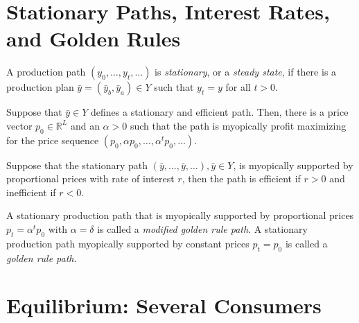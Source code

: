 \section{Stationary Paths, Interest Rates, and Golden Rules}

\begin{defn}
    A production path $(y_0, \dots, y_t, \dots)$ is \emph{stationary}, or a \emph{steady state}, if there is a production plan $\bar{y} = (\bar{y}_b, \bar{y}_a) \in Y$ such that $y_t = y$ for all $t > 0$.
\end{defn}

\begin{prop}
    Suppose that $\bar{y} \in Y$ defines a stationary and efficient path. Then, there is a price vector $p_0 \in \mathbb{R}^{L}$ and an $\alpha > 0$ such that the path is myopically profit maximizing for the price sequence $(p_0, \alpha p_0, \dots, \alpha^t p_0, \dots)$.
\end{prop}

\begin{prop}
    Suppose that the stationary path $(\bar{y}, \dots, \bar{y}, \dots), \bar{y} \in Y$, is myopically supported by proportional prices with rate of interest $r$, then the path is efficient if $r > 0$ and inefficient if $r < 0$.
\end{prop}

\begin{defn}
    A stationary production path that is myopically supported by proportional prices $p_t = \alpha^t p_0$ with $\alpha = \delta$ is called a \emph{modified golden rule path}. A stationary production path myopically supported by constant prices $p_t = p_0$ is called a \emph{golden rule path}.
\end{defn}

\addtocounter{section}{1}

\section{Equilibrium: Several Consumers}

